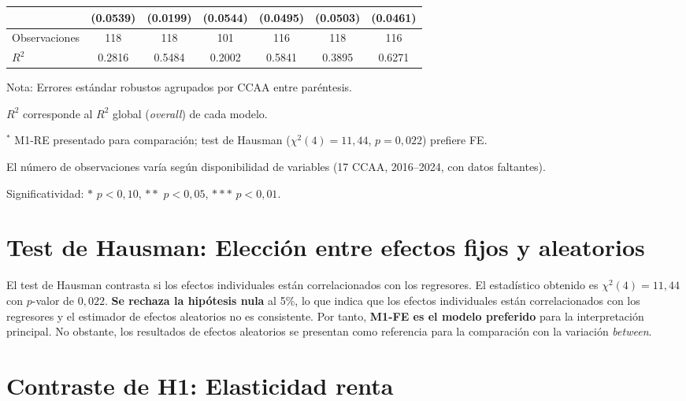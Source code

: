 \begin{table}[htbp]
\begin{threeparttable}
{\begin{tabular}{lS[table-format=-2.4]S[table-format=-2.4]
                       S[table-format=-2.4]S[table-format=-2.4]
                       S[table-format=-2.4]S[table-format=-2.4]}
        & {(0.0539)} & {(0.0199)} & {(0.0544)} & {(0.0495)} & {(0.0503)} & {(0.0461)} \\
      \midrule
      Observaciones & 118 & 118 & 101 & 116 & 118 & 116 \\
      $R^2$ & 0.2816 & 0.5484 & 0.2002 & 0.5841 & 0.3895 & 0.6271 \\
      \bottomrule
    \end{tabular}}
    \begin{tablenotes}[flushleft]
      \footnotesize
      \item Nota: Errores estándar robustos agrupados por CCAA entre paréntesis.
      \item $R^2$ corresponde al $R^2$ global (\textit{overall}) de cada modelo.
      \item $^*$ M1-RE presentado para comparación; test de Hausman ($\chi^2(4)=11{,}44$, $p=0{,}022$) prefiere FE.
      \item El número de observaciones varía según disponibilidad de variables
        (17 CCAA, 2016--2024, con datos faltantes).
      \item Significatividad: $*$ $p < 0{,}10$, $**$ $p < 0{,}05$,
        $***$ $p < 0{,}01$.
    \end{tablenotes}
  \end{threeparttable}
\end{table}

\section{Test de Hausman: Elección entre efectos fijos y aleatorios}
\label{sec:hausman_resultados}

El test de Hausman contrasta si los efectos individuales están correlacionados
con los regresores. El estadístico obtenido es $\chi^2(4) = 11{,}44$ con
$p$-valor de $0{,}022$. \textbf{Se rechaza la hipótesis nula} al 5\%, lo que
indica que los efectos individuales están correlacionados con los regresores y
el estimador de efectos aleatorios no es consistente. Por tanto,
\textbf{M1-FE es el modelo preferido} para la interpretación principal. No
obstante, los resultados de efectos aleatorios se presentan como referencia
para la comparación con la variación \textit{between}.

\section{Contraste de H1: Elasticidad renta}
\label{sec:h1}

